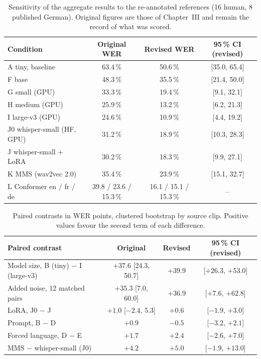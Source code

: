 \begin{table}[H]
\centering
\small
\setlength{\tabcolsep}{4pt}
\begin{tabular}{|l|c|c|c|}
\hline
\textbf{Condition} & \textbf{Original WER} & \textbf{Revised WER} & \textbf{95\,\% CI (revised)} \\ \hline
A tiny, baseline & 63.4\,\% & 50.6\,\% & [35.0, 65.4] \\ \hline
F base & 48.3\,\% & 35.5\,\% & [21.4, 50.0] \\ \hline
G small (GPU) & 33.3\,\% & 19.4\,\% & [9.1, 32.1] \\ \hline
H medium (GPU) & 25.9\,\% & 13.2\,\% & [6.2, 21.3] \\ \hline
I large-v3 (GPU) & 24.6\,\% & 10.9\,\% & [4.4, 19.2] \\ \hline
J0 whisper-small (HF, GPU) & 31.2\,\% & 18.9\,\% & [10.3, 28.3] \\ \hline
J whisper-small + LoRA & 30.2\,\% & 18.3\,\% & [9.9, 27.1] \\ \hline
K MMS (wav2vec 2.0) & 35.4\,\% & 23.9\,\% & [15.1, 32.7] \\ \hline
L Conformer en / fr / de & 39.8 / 23.6 / 15.3\,\% & 16.1 / 15.1 / 15.3\,\% & -- \\ \hline
\end{tabular}
\caption{Sensitivity of the aggregate results to the re-annotated references (16 human, 8 published German).
Original figures are those of Chapter~III and remain the record of what was scored.}
\label{tab:annex_revision}
\end{table}

\begin{table}[H]
\centering
\small
\begin{tabular}{|l|c|c|c|}
\hline
\textbf{Paired contrast} & \textbf{Original} & \textbf{Revised} & \textbf{95\,\% CI (revised)} \\ \hline
Model size, B (tiny) $-$ I (large-v3) & $+37.6$ [24.3, 50.7] & $+39.9$ & [$+26.3$, $+53.0$] \\ \hline
Added noise, 12 matched pairs & $+35.3$ [7.0, 60.0] & $+36.9$ & [$+7.6$, $+62.8$] \\ \hline
LoRA, J0 $-$ J & $+1.0$ [$-2.4$, 5.3] & $+0.6$ & [$-1.9$, $+3.0$] \\ \hline
Prompt, B $-$ D & $+0.9$ & $-0.5$ & [$-3.2$, $+2.1$] \\ \hline
Forced language, D $-$ E & $+1.7$ & $+2.4$ & [$-2.6$, $+7.0$] \\ \hline
MMS $-$ whisper-small (J0) & $+4.2$ & $+5.0$ & [$-1.9$, $+13.0$] \\ \hline
\end{tabular}
\caption{Paired contrasts in WER points, clustered bootstrap by source clip. Positive values favour the second
term of each difference.}
\label{tab:annex_contrasts}
\end{table}

